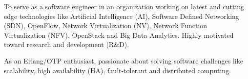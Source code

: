 

\begin{cvparagraph}

To serve as a software engineer in an organization working on latest and cutting edge
technologies like Artificial Intelligence (AI), Software Defined Networking (SDN), OpenFlow,
Network Virtualization (NV), Network Function Virtualization (NFV), OpenStack and
Big Data Analytics. Highly motivated toward research and development (R\&D).

As an Erlang/OTP enthusiast, passionate about solving software challenges like scalability,
high availability (HA), fault-tolerant and distributed computing.

\end{cvparagraph}
